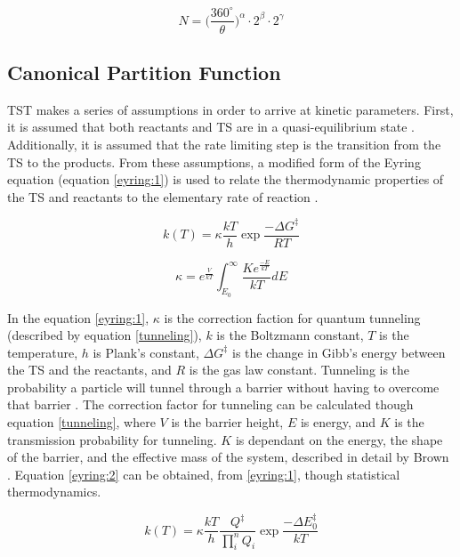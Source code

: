 \documentclass[preprint, 11pt]{elsarticle} %
\begin{document}
\begin{equation}
    N = \Big(\frac{360^\circ}{\theta}\Big)^{\alpha} \cdot 2^{\beta} \cdot 2^{\gamma}
    \label{eq:confs}
\end{equation}



\subsection{Canonical Partition Function}

TST makes a series of assumptions in order to arrive at kinetic parameters. 
First, it is assumed that both reactants and TS are in a quasi-equilibrium state \cite{QSS:2017}.
Additionally, it is assumed that the rate limiting step is the transition from the TS to the products. 
From these assumptions, a modified form of the Eyring equation (equation \ref{eyring:1}) is used to relate the thermodynamic properties of the TS and reactants to the elementary rate of reaction \cite{eyring:1935}.


\begin{equation}
    k(T) = \kappa \frac{k T}{h} \exp{\frac{-\Delta G^\ddagger}{RT}}
    \label{eyring:1}
\end{equation}

\begin{equation}
    \kappa = e^{\frac{V}{kT}} \int^{\infty}_{E_0} \frac{K e^{\frac{-E}{kT}}}{kT} dE
    \label{tunneling}
\end{equation}

In the equation \ref{eyring:1}, $\kappa$ is the correction faction for quantum tunneling (described by equation \ref{tunneling}), $k$ is the Boltzmann constant, $T$ is the temperature, $h$ is Plank's constant, $\Delta G^\ddagger$ is the change in Gibb's energy between the TS and the reactants, and $R$ is the gas law constant. 
Tunneling is the probability a particle will tunnel through a barrier without having to overcome that barrier \cite{RUBAKOV:1984}.
The correction factor for tunneling can be calculated though equation \ref{tunneling}, where $V$ is the barrier height, $E$ is energy, and $K$ is the transmission probability for tunneling.
$K$ is dependant on the energy, the shape of the barrier, and the effective mass of the system, described in detail by Brown \cite{Brown:1981}.
Equation \ref{eyring:2} can be obtained, from \ref{eyring:1}, though statistical thermodynamics.

\begin{equation}
    k(T) = \kappa \frac{k T}{h} \frac{Q^\ddagger}{\prod^{n}_{i} Q_i} \exp{\frac{-\Delta E^{\ddagger}_{0}}{k T}}
    \label{eyring:2}
\end{equation}
\end{document}
